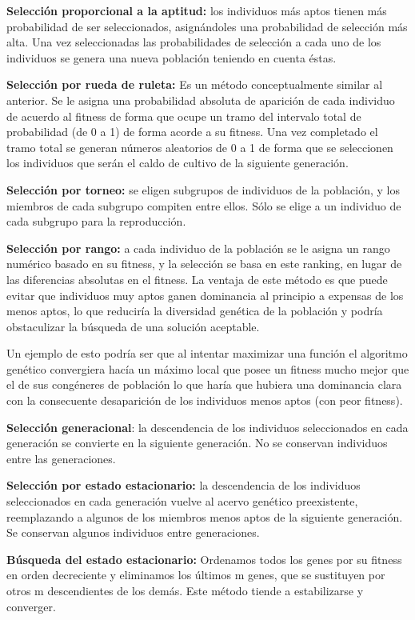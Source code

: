 \documentclass[
  a4paper,
  DIV=11,
  numbers=noendperiod]{scrreprt}
\begin{document}
\textbf{Selección proporcional a la aptitud:} los individuos más aptos
tienen más probabilidad de ser seleccionados, asignándoles una
probabilidad de selección más alta. Una vez seleccionadas las
probabilidades de selección a cada uno de los individuos se genera una
nueva población teniendo en cuenta éstas.

\textbf{Selección por rueda de ruleta:} Es un método conceptualmente
similar al anterior. Se le asigna una probabilidad absoluta de aparición
de cada individuo de acuerdo al fitness de forma que ocupe un tramo del
intervalo total de probabilidad (de 0 a 1) de forma acorde a su fitness.
Una vez completado el tramo total se generan números aleatorios de 0 a 1
de forma que se seleccionen los individuos que serán el caldo de cultivo
de la siguiente generación.

\textbf{Selección por torneo:} se eligen subgrupos de individuos de la
población, y los miembros de cada subgrupo compiten entre ellos. Sólo se
elige a un individuo de cada subgrupo para la reproducción.

\textbf{Selección por rango:} a cada individuo de la población se le
asigna un rango numérico basado en su fitness, y la selección se basa en
este ranking, en lugar de las diferencias absolutas en el fitness. La
ventaja de este método es que puede evitar que individuos muy aptos
ganen dominancia al principio a expensas de los menos aptos, lo que
reduciría la diversidad genética de la población y podría obstaculizar
la búsqueda de una solución aceptable.

Un ejemplo de esto podría ser que al intentar maximizar una función el
algoritmo genético convergiera hacía un máximo local que posee un
fitness mucho mejor que el de sus congéneres de población lo que haría
que hubiera una dominancia clara con la consecuente desaparición de los
individuos menos aptos (con peor fitness).

\textbf{Selección generacional}: la descendencia de los individuos
seleccionados en cada generación se convierte en la siguiente
generación. No se conservan individuos entre las generaciones.

\textbf{Selección por estado estacionario:} la descendencia de los
individuos seleccionados en cada generación vuelve al acervo genético
preexistente, reemplazando a algunos de los miembros menos aptos de la
siguiente generación. Se conservan algunos individuos entre
generaciones.

\textbf{Búsqueda del estado estacionario:} Ordenamos todos los genes por
su fitness en orden decreciente y eliminamos los últimos m genes, que se
sustituyen por otros m descendientes de los demás. Este método tiende a
estabilizarse y converger.
\end{document}
